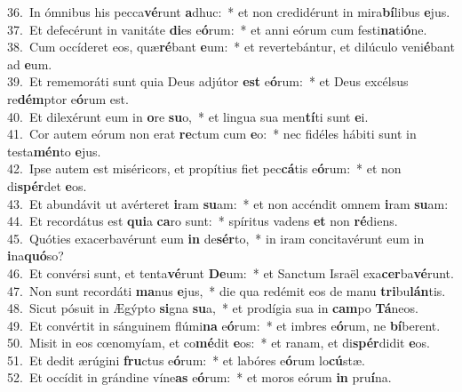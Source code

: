 {36.~}In ómnibus his pecca\textbf{vé}runt \textbf{a}dhuc:~* et non credidérunt in mira\textbf{bí}libus \textbf{e}jus.\\
{37.~}Et defecérunt in vanitáte \textbf{di}es e\textbf{ó}rum:~* et anni eórum cum festi\textbf{na}ti\textbf{ó}ne.\\
{38.~}Cum occíderet eos, quæ\textbf{ré}bant \textbf{e}um:~* et revertebántur, et dilúculo veni\textbf{é}bant ad \textbf{e}um.\\
{39.~}Et rememoráti sunt quia Deus adjútor \textbf{est} e\textbf{ó}rum:~* et Deus excélsus re\textbf{dém}ptor e\textbf{ó}rum est.\\
{40.~}Et dilexérunt eum in \textbf{o}re \textbf{su}o,~* et lingua sua men\textbf{tí}ti sunt \textbf{e}i.\\
{41.~}Cor autem eórum non erat \textbf{re}ctum cum \textbf{e}o:~* nec fidéles hábiti sunt in testa\textbf{mén}to \textbf{e}jus.\\
{42.~}Ipse autem est miséricors, et propítius fiet pec\textbf{cá}tis e\textbf{ó}rum:~* et non di\textbf{spér}det \textbf{e}os.\\
{43.~}Et abundávit ut avérteret \textbf{i}ram \textbf{su}am:~* et non accéndit omnem \textbf{i}ram \textbf{su}am:\\
{44.~}Et recordátus est \textbf{qui}a \textbf{ca}ro sunt:~* spíritus vadens \textbf{et} non \textbf{ré}diens.\\
{45.~}Quóties exacerbavérunt eum \textbf{in} de\textbf{sér}to,~* in iram concitavérunt eum in \textbf{i}na\textbf{quó}so?\\
{46.~}Et convérsi sunt, et tenta\textbf{vé}runt \textbf{De}um:~* et Sanctum Israël exa\textbf{cer}ba\textbf{vé}runt.\\
{47.~}Non sunt recordáti \textbf{ma}nus \textbf{e}jus,~* die qua redémit eos de manu \textbf{tri}bu\textbf{lán}tis.\\
{48.~}Sicut pósuit in Ægýpto \textbf{si}gna \textbf{su}a,~* et prodígia sua in \textbf{cam}po \textbf{Tá}neos.\\
{49.~}Et convértit in sánguinem flúmi\textbf{na} e\textbf{ó}rum:~* et imbres e\textbf{ó}rum, ne \textbf{bí}berent.\\
{50.~}Misit in eos cœnomyíam, et co\textbf{mé}dit \textbf{e}os:~* et ranam, et di\textbf{spér}didit \textbf{e}os.\\
{51.~}Et dedit ærúgini \textbf{fru}ctus e\textbf{ó}rum:~* et labóres e\textbf{ó}rum lo\textbf{cú}stæ.\\
{52.~}Et occídit in grándine víne\textbf{as} e\textbf{ó}rum:~* et moros eórum \textbf{in} pru\textbf{í}na.\\
